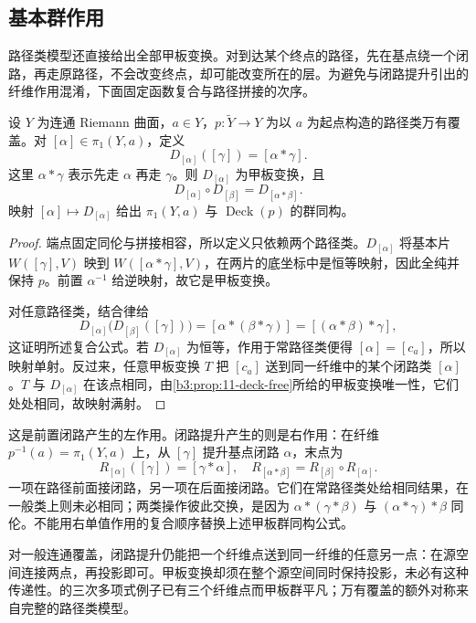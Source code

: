 \subsection{基本群作用}
\label{b3:subsec:110302}

路径类模型还直接给出全部甲板变换。对到达某个终点的路径，先在基点绕一个闭路，再走原路径，不会改变终点，却可能改变所在的层。为避免与闭路提升引出的纤维作用混淆，下面固定函数复合与路径拼接的次序。

\begin{proposition}[基本群的前置作用]\label{b3:prop:11-fundamental-deck-action}
设 \(Y\) 为连通 Riemann 曲面，\(a\in Y\)，\(p:\widetilde Y\rightarrow Y\) 为以 \(a\) 为起点构造的路径类万有覆盖。对 \([\alpha]\in\pi_1(Y,a)\)，定义
\[
 D_{[\alpha]}([\gamma])=[\alpha*\gamma].
\]
这里 \(\alpha*\gamma\) 表示先走 \(\alpha\) 再走 \(\gamma\)。则 \(D_{[\alpha]}\) 为甲板变换，且
\[
 D_{[\alpha]}\circ D_{[\beta]}=D_{[\alpha*\beta]}.
\]
映射 \([\alpha]\mapsto D_{[\alpha]}\) 给出 \(\pi_1(Y,a)\) 与 \(\operatorname{Deck}(p)\) 的群同构。
\end{proposition}
\begin{proof}
端点固定同伦与拼接相容，所以定义只依赖两个路径类。\(D_{[\alpha]}\) 将基本片 \(W([\gamma],V)\) 映到 \(W([\alpha*\gamma],V)\)，在两片的底坐标中是恒等映射，因此全纯并保持 \(p\)。前置 \(\alpha^{-1}\) 给逆映射，故它是甲板变换。

对任意路径类，结合律给
\[
 D_{[\alpha]}\bigl(D_{[\beta]}([\gamma])\bigr)
 =[\alpha*(\beta*\gamma)]
 =[(\alpha*\beta)*\gamma],
\]
这证明所述复合公式。若 \(D_{[\alpha]}\) 为恒等，作用于常路径类便得 \([\alpha]=[c_a]\)，所以映射单射。反过来，任意甲板变换 \(T\) 把 \([c_a]\) 送到同一纤维中的某个闭路类 \([\alpha]\)。\(T\) 与 \(D_{[\alpha]}\) 在该点相同，由\cref{b3:prop:11-deck-free}所给的甲板变换唯一性，它们处处相同，故映射满射。
\end{proof}

这是前置闭路产生的左作用。闭路提升产生的则是右作用：在纤维 \(p^{-1}(a)=\pi_1(Y,a)\) 上，从 \([\gamma]\) 提升基点闭路 \(\alpha\)，末点为
\[
 R_{[\alpha]}([\gamma])=[\gamma*\alpha],\quad
 R_{[\alpha*\beta]}=R_{[\beta]}\circ R_{[\alpha]}.
\]
一项在路径前面接闭路，另一项在后面接闭路。它们在常路径类处给相同结果，在一般类上则未必相同；两类操作彼此交换，是因为 \(\alpha*(\gamma*\beta)\) 与 \((\alpha*\gamma)*\beta\) 同伦。不能用右单值作用的复合顺序替换上述甲板群同构公式。

\ProseParagraphBreak
对一般连通覆盖，闭路提升仍能把一个纤维点送到同一纤维的任意另一点：在源空间连接两点，再投影即可。甲板变换却须在整个源空间同时保持投影，未必有这种传递性。的三次多项式例子已有三个纤维点而甲板群平凡；万有覆盖的额外对称来自完整的路径类模型。

